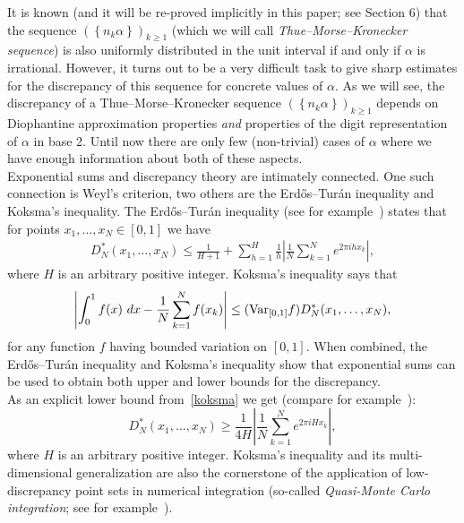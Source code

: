 \documentclass[12pt]{amsart}
\begin{document}
It is known (and it will be re-proved implicitly in this paper; see Section 6) that the sequence $\left(\left\{n_{k} \alpha\right\}\right)_{k\geq 1}$ (which we will call \emph{Thue--Morse--Kronecker sequence}) is also uniformly distributed in the unit interval if and only if $\alpha$ is irrational. However, it turns out to be a very difficult task to give sharp estimates for the discrepancy of this sequence for concrete values of $\alpha$. As we will see, the discrepancy of a Thue--Morse--Kronecker sequence $\left(\left\{n_{k} \alpha \right\}\right)_{k \geq 1}$ depends on {D}iophantine approximation properties {\em and} properties of the digit representation of $\alpha$ in base 2. Until now there are only few (non-trivial) cases of $\alpha$ where we have enough information about both of these aspects.\\

Exponential sums and discrepancy theory are intimately connected. One such connection is Weyl's criterion, two others are the Erd\H os--Tur\'an inequality and Koksma's inequality. The Erd\H os--Tur\'an inequality (see for example~\cite{dts,knu,rt}) states that for points $x_1, \dots, x_N \in [0,1]$ we have
\begin{eqnarray} \label{erdtur}
D_N^* (x_1, \dots, x_N) \leq \frac{1}{H+1} + \sum_{h=1}^H \frac{1}{h} \left|\frac{1}{N} \sum_{k=1}^N e^{2 \pi i h x_k} \right|,
\end{eqnarray}
where $H$ is an arbitrary positive integer. Koksma's inequality says that 
\begin{equation} \label{koksma}
\left| \int_0^1 f(x)~dx - \frac{1}{N}\sum_{k=1}^N f(x_k) \right| \leq (\textup{Var}_{[0,1]} f) D_N^*(x_1, \dots, x_N),
\end{equation}
for any function $f$ having bounded variation on $[0,1]$. When combined, the Erd\H os--Tur\'an inequality and Koksma's inequality show that exponential sums can be used to obtain both upper and lower bounds for the discrepancy.\\

As an explicit lower bound from~\eqref{koksma} we get (compare for example~\cite{knu}):
\begin{equation} \label{BL1}
D^{*}_{N}  \left(x_{1}, \ldots, x_{N}\right) \geq \frac{1}{4H} \left|\frac{1}{N}\sum^{N}_{k=1} e^{2 \pi i H x_{k}}\right|,
\end{equation}
where $H$ is an arbitrary positive integer. Koksma's inequality and its multi-dimensional generalization are also the cornerstone of the application of low-discrepancy point sets in numerical integration (so-called \emph{Quasi-Monte Carlo integration}; see for example~\cite{dpd,nwt}).\\
\end{document}
